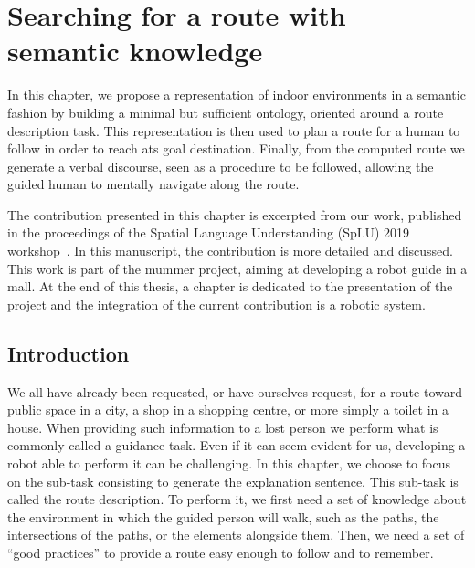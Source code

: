 \ifdefined{}
\else
\setcounter{chapter}{3} %
\dominitoc
\faketableofcontents
\fi

\chapter{Searching for a route with semantic knowledge}
\label{chap:3}
\minitoc

In this chapter, we propose a representation of indoor environments in a semantic fashion by building a minimal but sufficient ontology, oriented around a route description task. This representation is then used to plan a route for a human to follow in order to reach ats goal destination. Finally, from the computed route we generate a verbal discourse, seen as a procedure to be followed, allowing the guided human to mentally navigate along the route.

The contribution presented in this chapter is excerpted from our work, published in the proceedings of the Spatial Language Understanding (SpLU) 2019 workshop~\cite{sarthou_2019_semantic}. In this manuscript, the contribution is more detailed and discussed. This work is part of the \acrshort{mummer} project, aiming at developing a robot guide in a mall. At the end of this thesis, a chapter is dedicated to the presentation of the project and the integration of the current contribution is a robotic system.

\section{Introduction}

We all have already been requested, or have ourselves request, for a route toward public space in a city, a shop in a shopping centre, or more simply a toilet in a house. When providing such information to a lost person we perform what is commonly called a guidance task. Even if it can seem evident for us, developing a robot able to perform it can be challenging. In this chapter, we choose to focus on the sub-task consisting to generate the explanation sentence. This sub-task is called the route description. To perform it, we first need a set of knowledge about the environment in which the guided person will walk, such as the paths, the intersections of the paths, or the elements alongside them. Then, we need a set of ``good practices'' to provide a route easy enough to follow and to remember.


